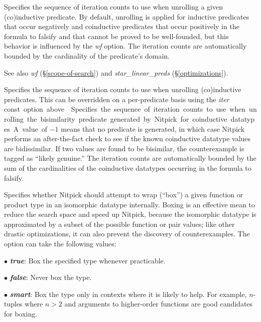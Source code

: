 \documentclass[a4paper,12pt]{article}
\begin{document}
\begin{enum}
Specifies the sequence of iteration counts to use when unrolling a given
(co)in\-duc\-tive predicate. By default, unrolling is applied for inductive
predicates that occur negatively and coinductive predicates that occur
positively in the formula to falsify and that cannot be proved to be
well-founded, but this behavior is influenced by the \textit{wf} option. The
iteration counts are automatically bounded by the cardinality of the predicate's
domain.

{\small See also \textit{wf} (\S\ref{scope-of-search}) and
\textit{star\_linear\_preds} (\S\ref{optimizations}).}

Specifies the sequence of iteration counts to use when unrolling (co)in\-duc\-tive
predicates. This can be overridden on a per-predicate basis using the
\textit{iter} \qty{const} option above.

Specifies the sequence of iteration counts to use when unrolling the
bisimilarity predicate generated by Nitpick for coinductive datatypes. A value
of $-1$ means that no predicate is generated, in which case Nitpick performs an
after-the-fact check to see if the known coinductive datatype values are
bidissimilar. If two values are found to be bisimilar, the counterexample is
tagged as ``likely genuine.'' The iteration counts are automatically bounded by
the sum of the cardinalities of the coinductive datatypes occurring in the
formula to falsify.

Specifies whether Nitpick should attempt to wrap (``box'') a given function or
product type in an isomorphic datatype internally. Boxing is an effective mean
to reduce the search space and speed up Nitpick, because the isomorphic datatype
is approximated by a subset of the possible function or pair values;
like other drastic optimizations, it can also prevent the discovery of
counterexamples. The option can take the following values:

\begin{enum}
\item[$\bullet$] \textbf{\textit{true}}: Box the specified type whenever
practicable.
\item[$\bullet$] \textbf{\textit{false}}: Never box the type.
\item[$\bullet$] \textbf{\textit{smart}}: Box the type only in contexts where it
is likely to help. For example, $n$-tuples where $n > 2$ and arguments to
higher-order functions are good candidates for boxing.
\end{enum}


\end{enum}
\end{document}
